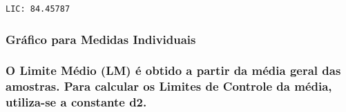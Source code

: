 \documentclass[
  letterpaper,
  DIV=11,
  numbers=noendperiod]{scrartcl}
\begin{document}
\begin{verbatim}
LIC: 84.45787 
\end{verbatim}

\subsubsection{Gráfico para Medidas
Individuais}\label{gruxe1fico-para-medidas-individuais}

\subsubsection{O Limite Médio (LM) é obtido a partir da média geral das
amostras. Para calcular os Limites de Controle da média, utiliza-se a
constante
d2.}\label{o-limite-muxe9dio-lm-uxe9-obtido-a-partir-da-muxe9dia-geral-das-amostras.-para-calcular-os-limites-de-controle-da-muxe9dia-utiliza-se-a-constante-d2.}
\end{document}
